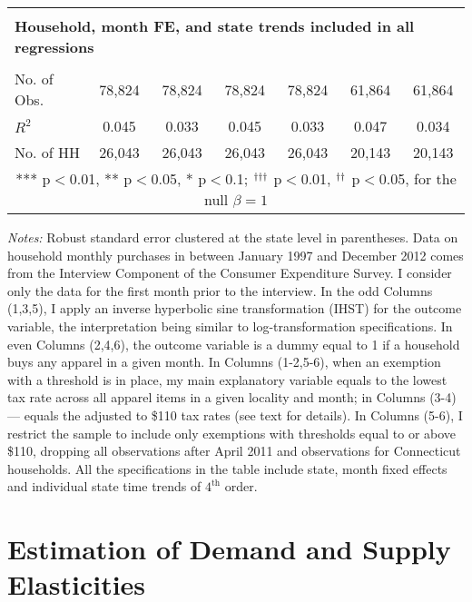 \documentclass[12pt]{article}
\begin{document}
\begin{table}
\begin{threeparttable}
\begin{tabular}{lcccccc}
				& & & & & & \\
				\multicolumn{7}{l}{\textbf{Household, month FE, and state trends included in all regressions}}                                           \\
				&         &                         &         &         &                       &  \\
				No. of Obs.  				& 78,824 & 78,824 & 78,824 & 78,824 & 61,864 & 61,864 \\
				$R^2$                       & 0.045 & 0.033 & 0.045 & 0.033 & 0.047 & 0.034  \\
				No. of HH                   & 26,043 & 26,043 & 26,043 & 26,043 & 20,143 & 20,143  \\ \hline
				\multicolumn{7}{c}{ *** p$<$0.01, ** p$<$0.05, * p$<$0.1; $^\text{\textdagger\textdagger\textdagger}$ p$<$0.01, $^\text{\textdagger\textdagger}$ p$<$0.05, for the null $\beta=1$}
			\end{tabular}
			\begin{tablenotes}
				\small \emph{Notes:}  Robust standard error clustered at the state level in parentheses. Data on household monthly purchases in between January 1997 and December 2012 comes from the Interview Component of the Consumer Expenditure Survey. I consider only the data for the first month prior to the interview. In the odd Columns (1,3,5), I apply an inverse hyperbolic sine transformation (IHST) for the outcome variable, the interpretation being similar to log-transformation specifications. In even Columns (2,4,6), the outcome variable is a dummy equal to 1 if a household buys any apparel in a given month. In Columns (1-2,5-6), when an exemption with a threshold is in place, my main explanatory variable equals to the lowest tax rate across all apparel items in a given locality and month; in Columns (3-4) --- equals the adjusted to \$110 tax rates (see text for details). In Columns (5-6), I restrict the sample to include only exemptions with thresholds equal to or above \$110, dropping all observations after April 2011 and observations for Connecticut households. All the specifications in the table include state, month fixed effects and individual state time trends of $4^\text{th}$ order. \\
			\end{tablenotes}
		\end{threeparttable}
	\end{table}

	
	\section{Estimation of Demand and Supply Elasticities}
			\label{app:dse}
			
\end{document}
